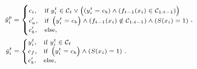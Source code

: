 \vspace{-10pt}
\begin{equation}
    \scriptsize
    \begin{aligned}
        \tilde{y}^p_{i} &= \begin{cases}
            c_i, & \text{if} ~y^t_{i}\in\mathcal{C}_t \vee \left( (y^t_{i}=c_b) \wedge \left( f_{t-1}(x_i)\in\mathcal{C}_{1:t-1} \right) \right) \\
            c'_u, & \text{if} ~\left( y^t_{i}=c_b \right) \wedge \left( f_{t-1}(x_i) \notin \mathcal{C}_{1:t-1} \right) \wedge \left( S(x_i)=1 \right) \\
            c'_b, & \text{else,}
        \end{cases}, \\
        \tilde{y}^t_{i} &= \begin{cases}
            y^t_{i}, & \text{if} ~y^t_{i}\in\mathcal{C}_t \\
            c_f, & \text{if} ~\left( y^t_{i}=c_b \right) \wedge \left( S(x_i)=1 \right) \\
            c'_b, & \text{else,}
        \end{cases}.
    \end{aligned}
    \normalsize
    \label{equ_label}
\end{equation}
\vspace{-10pt}

